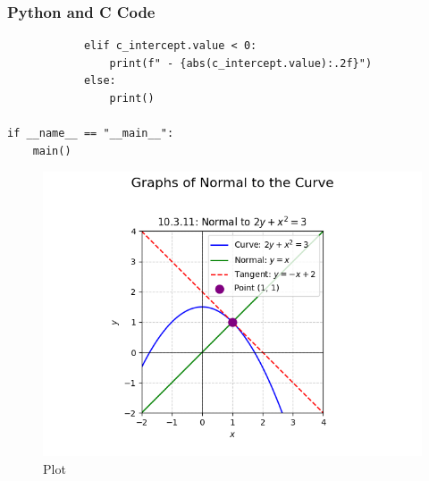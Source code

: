 \documentclass{beamer}
\begin{document}
\begin{frame}[fragile]
\frametitle{Python and C Code}
\begin{lstlisting}
            elif c_intercept.value < 0:
                print(f" - {abs(c_intercept.value):.2f}")
            else:
                print()

if __name__ == "__main__":
    main()

\end{lstlisting}
\end{frame}
\begin{frame}
\begin{figure}[H]
    \centering
    \includegraphics[width=0.75\columnwidth]{graph-17.png}
    \caption{Plot}
    \label{fig:placeholder}
\end{figure}
\end{frame}
\end{document}
